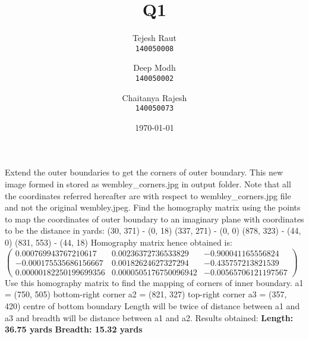 \documentclass{article}
\title{Q1}
\date{\today}
\author{
	Tejesh Raut\\
	\texttt{140050008}
	\and
	Deep Modh\\
	\texttt{140050002}
	\and
	Chaitanya Rajesh\\
	\texttt{140050073}
}
\begin{document}
	\maketitle
	Extend the outer boundaries to get the corners of outer boundary.
	\newline
	This new image formed in stored as wembley\_corners.jpg in output folder. Note that all the coordinates referred hereafter are with respect to wembley\_corners.jpg file and not the original wembley.jpeg.
	\newline
	\newline
	Find the homography matrix using the points to map the coordinates of outer boundary to an imaginary plane with coordinates to be the distance in yards:
	\newline
	(30, 371) - (0, 18)
	\newline
	(337, 271) - (0, 0)
	\newline
	(878, 323) - (44, 0)
	\newline
	(831, 553) - (44, 18)
	\newline
	Homography matrix hence obtained is:
	\newline
	\begin{math}
	\begin{pmatrix}
	0.000769943767210617&0.00236372736533829&-0.900041165556824 \\
	-0.000175535686156667&0.00182624627327294&-0.435757213821539 \\
	0.00000182250199699356&0.0000505176750096942&-0.00565706121197567
	\end{pmatrix}
	\end{math}
	\newline
	Use this homography matrix to find the mapping of corners of inner boundary.
	\newline
	a1 = (750, 505) bottom-right corner 
	\newline
	a2 = (821, 327) top-right corner
	\newline
	a3 = (357, 420) centre of bottom boundary
	\newline
	Length will be twice of distance between a1 and a3 and breadth will be distance between a1 and a2.
	\newline
	\newline
	Results obtained:
	\newline
	\textbf{Length: 36.75 yards}
	\newline
	\textbf{Breadth: 15.32 yards}
\end{document}
